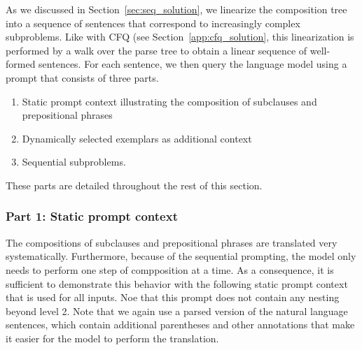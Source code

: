 \documentclass{article} \usepackage{iclr2022_conference,times}
\begin{document}
As we discussed in Section~\ref{sec:seq_solution}, we linearize the composition tree into a sequence of sentences that correspond to increasingly complex subproblems. Like with CFQ (see Section~\ref{app:cfq_solution}, this linearization is performed by a walk over the parse tree to obtain a linear sequence of well-formed sentences. For each sentence, we then query the language model using a prompt that consists of three parts.

\begin{enumerate}
    \item Static prompt context illustrating the composition of subclauses and prepositional phrases
    \item Dynamically selected exemplars as additional context
    \item Sequential subproblems.
\end{enumerate}

These parts are detailed throughout the rest of this section.

\subsubsection{Part 1: Static prompt context}
The compositions of subclauses and prepositional phrases are translated very systematically. Furthermore, because of the sequential prompting, the model only needs to perform one step of compposition at a time. As a consequence, it is sufficient to demonstrate this behavior with the following static prompt context that is used for all inputs. Noe that this prompt does not contain any nesting beyond level 2. Note that we again use a parsed version of the natural language sentences, which contain additional parentheses and other annotations that make it easier for the model to perform the translation.
\end{document}
